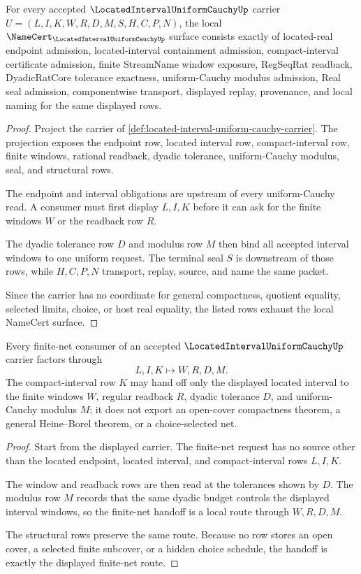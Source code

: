 \begin{theorem}
\label{thm:located-interval-uniform-cauchy-namecert-obligations}
For every accepted $\LocatedIntervalUniformCauchyUp$ carrier $U=(L,I,K,W,R,D,M,S,H,C,P,N)$, the local $\NameCert_{\LocatedIntervalUniformCauchyUp}$ surface consists exactly of located-real endpoint admission, located-interval containment admission, compact-interval certificate admission, finite StreamName window exposure, RegSeqRat readback, DyadicRatCore tolerance exactness, uniform-Cauchy modulus admission, Real seal admission, componentwise transport, displayed replay, provenance, and local naming for the same displayed rows.
\end{theorem}
\begin{proof}
Project the carrier of \autoref{def:located-interval-uniform-cauchy-carrier}. The projection exposes the endpoint row, located interval row, compact-interval row, finite windows, rational readback, dyadic tolerance, uniform-Cauchy modulus, seal, and structural rows.

The endpoint and interval obligations are upstream of every uniform-Cauchy read. A consumer must first display $L,I,K$ before it can ask for the finite windows $W$ or the readback row $R$.

The dyadic tolerance row $D$ and modulus row $M$ then bind all accepted interval windows to one uniform request. The terminal seal $S$ is downstream of those rows, while $H,C,P,N$ transport, replay, source, and name the same packet.

Since the carrier has no coordinate for general compactness, quotient equality, selected limits, choice, or host real equality, the listed rows exhaust the local NameCert surface.
\end{proof}

\begin{theorem}
\label{thm:located-interval-uniform-cauchy-finite-net-handoff}
Every finite-net consumer of an accepted $\LocatedIntervalUniformCauchyUp$ carrier factors through
$$
L,I,K \longmapsto W,R,D,M .
$$
The compact-interval row $K$ may hand off only the displayed located interval to the finite windows $W$, regular readback $R$, dyadic tolerance $D$, and uniform-Cauchy modulus $M$; it does not export an open-cover compactness theorem, a general Heine--Borel theorem, or a choice-selected net.
\end{theorem}
\begin{proof}
Start from the displayed carrier. The finite-net request has no source other than the located endpoint, located interval, and compact-interval rows $L,I,K$.

The window and readback rows are then read at the tolerances shown by $D$. The modulus row $M$ records that the same dyadic budget controls the displayed interval windows, so the finite-net handoff is a local route through $W,R,D,M$.

The structural rows preserve the same route. Because no row stores an open cover, a selected finite subcover, or a hidden choice schedule, the handoff is exactly the displayed finite-net route.
\end{proof}


